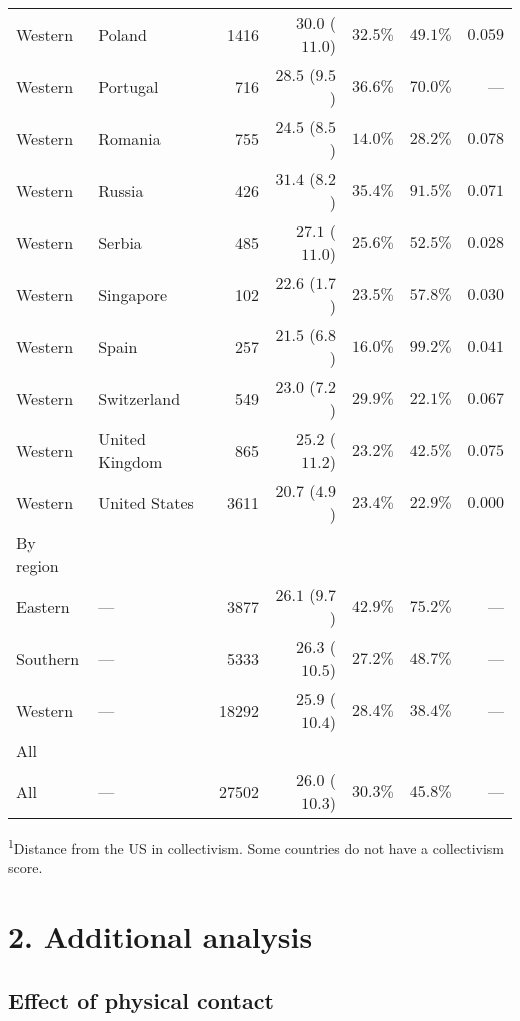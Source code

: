 \documentclass[
]{article}
\begin{document}
\begin{longtable}{llrrrrr}
Western & Poland & 1416 & $30.0$ ($11.0$) & $32.5\%$ & $49.1\%$ & $0.059$ \\ 
Western & Portugal & 716 & $28.5$ ($9.5$) & $36.6\%$ & $70.0\%$ & --- \\ 
Western & Romania & 755 & $24.5$ ($8.5$) & $14.0\%$ & $28.2\%$ & $0.078$ \\ 
Western & Russia & 426 & $31.4$ ($8.2$) & $35.4\%$ & $91.5\%$ & $0.071$ \\ 
Western & Serbia & 485 & $27.1$ ($11.0$) & $25.6\%$ & $52.5\%$ & $0.028$ \\ 
Western & Singapore & 102 & $22.6$ ($1.7$) & $23.5\%$ & $57.8\%$ & $0.030$ \\ 
Western & Spain & 257 & $21.5$ ($6.8$) & $16.0\%$ & $99.2\%$ & $0.041$ \\ 
Western & Switzerland & 549 & $23.0$ ($7.2$) & $29.9\%$ & $22.1\%$ & $0.067$ \\ 
Western & United Kingdom & 865 & $25.2$ ($11.2$) & $23.2\%$ & $42.5\%$ & $0.075$ \\ 
Western & United States & 3611 & $20.7$ ($4.9$) & $23.4\%$ & $22.9\%$ & $0.000$ \\ 
\midrule
\multicolumn{1}{l}{By region} \\ 
\midrule
Eastern & --- & 3877 & $26.1$ ($9.7$) & $42.9\%$ & $75.2\%$ & --- \\ 
Southern & --- & 5333 & $26.3$ ($10.5$) & $27.2\%$ & $48.7\%$ & --- \\ 
Western & --- & 18292 & $25.9$ ($10.4$) & $28.4\%$ & $38.4\%$ & --- \\ 
\midrule
\multicolumn{1}{l}{All} \\ 
All & --- & 27502 & $26.0$ ($10.3$) & $30.3\%$ & $45.8\%$ & --- \\ 
 \bottomrule
\end{longtable}
\vspace{-5mm}
\begin{minipage}{\linewidth}
\textsuperscript{1}Distance from the US in collectivism. Some countries do not have a collectivism score. \\ 
\end{minipage}

\hypertarget{additional-analysis}{%
\section{2. Additional analysis}\label{additional-analysis}}

\hypertarget{effect-of-physical-contact}{%
\subsection{Effect of physical
contact}\label{effect-of-physical-contact}}
\end{document}
